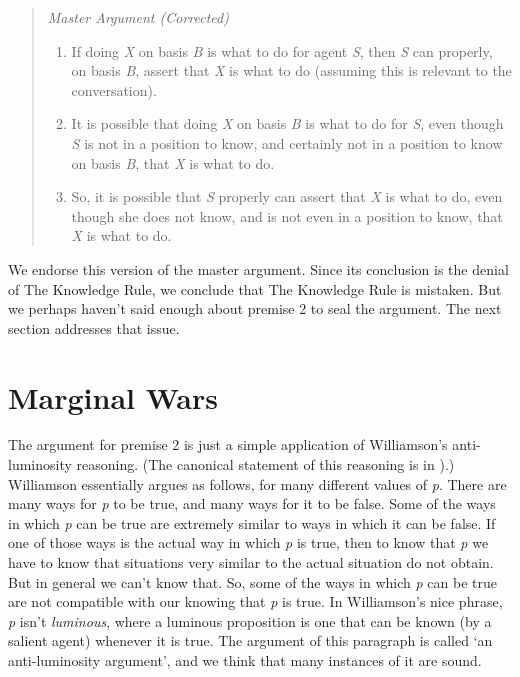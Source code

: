 \begin{quote}
{\itshape
Master Argument (Corrected)}
\begin{enumerate}
\item If doing \textit{X} on basis \textit{B} is what to do for agent \textit{S}, then \textit{S} can properly, on basis \textit{B}, assert that \textit{X} is what to do (assuming this is relevant to the conversation).
\item It is possible that doing \textit{X} on basis \textit{B} is what to do for \textit{S}, even though \textit{S} is not in a position to know, and certainly not in a position to know on basis \textit{B}, that \textit{X} is what to do.
\item So, it is possible that \textit{S} properly can assert that \textit{X} is what to do, even though she does not know, and is not even in a position to know, that \textit{X} is what to do.
\end{enumerate}
\end{quote}

\noindent We endorse this version of the master argument. Since its conclusion is the denial of The Knowledge Rule, we conclude that The Knowledge Rule is mistaken. But we perhaps haven't said enough about premise 2 to seal the argument. The next section addresses that issue.

\section{Marginal Wars}

The argument for premise 2 is just a simple application of Williamson's anti\hyp{}luminosity reasoning. (The canonical statement of this reasoning is in \cite[Ch. 4]{Williamson2000-WILKAI}).) Williamson essentially argues as follows, for many different values of \textit{p}. There are many ways for \textit{p} to be true, and many ways for it to be false. Some of the ways in which \textit{p} can be true are extremely similar to ways in which it can be false. If one of those ways is the actual way in which \textit{p} is true, then to know that \textit{p} we have to know that situations very similar to the actual situation do not obtain. But in general we can't know that. So, some of the ways in which \textit{p} can be true are not compatible with our knowing that \textit{p} is true. In Williamson's nice phrase, \textit{p} isn't \textit{luminous}, where a luminous proposition is one that can be known (by a salient agent) whenever it is true. The argument of this paragraph is called `an anti-luminosity argument', and we think that many instances of it are sound.

